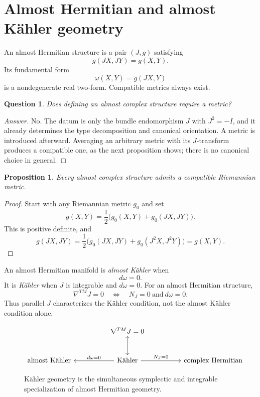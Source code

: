 \documentclass[11pt,oneside,reqno]{book}
\theoremstyle{plain}
\newtheorem{proposition}[theorem]{Proposition}
\newtheorem{question}[theorem]{Question}
\theoremstyle{definition}
\theoremstyle{remark}
\newenvironment{answer}{\begin{proof}[Answer]}{\end{proof}}
\begin{document}
\section{Almost Hermitian and almost Kähler geometry}

An almost Hermitian structure is a pair \((J,g)\) satisfying
\[
 g(JX,JY)=g(X,Y).
\]
Its fundamental form
\[
 \omega(X,Y)=g(JX,Y)
\]
is a nondegenerate real two-form. Compatible metrics always exist.

\begin{question}
Does defining an almost complex structure require a metric?
\end{question}

\begin{answer}
No.  The datum is only the bundle endomorphism \(J\) with \(J^2=-I\), and
it already determines the type decomposition and canonical orientation.
A metric is introduced afterward.  Averaging an arbitrary metric with its
\(J\)-transform produces a compatible one, as the next proposition shows;
there is no canonical choice in general.
\end{answer}

\begin{proposition}
Every almost complex structure admits a compatible Riemannian metric.
\end{proposition}

\begin{proof}
Start with any Riemannian metric \(g_0\) and set
\[
 g(X,Y)=\frac12\bigl(g_0(X,Y)+g_0(JX,JY)\bigr).
\]
This is positive definite, and
\[
 g(JX,JY)
 =\frac12\bigl(g_0(JX,JY)+g_0(J^2X,J^2Y)\bigr)
 =g(X,Y).
\]
\end{proof}

An almost Hermitian manifold is \emph{almost Kähler} when
\[
 d\omega=0.
\]
It is \emph{Kähler} when \(J\) is integrable and \(d\omega=0\).
For an almost Hermitian structure,
\[
 \nabla^{TM}J=0
 \quad\Longleftrightarrow\quad
 N_J=0\ \text{and}\ d\omega=0.
\]
Thus parallel \(J\) characterizes the Kähler condition, not the almost
Kähler condition alone.

\begin{figure}[htbp]
\centering
\[
\begin{tikzcd}[column sep=huge,row sep=large]
 &\nabla^{TM}J=0
   \arrow[d,leftrightarrow]&\\
 \text{almost Kähler}
 &\text{Kähler}
   \arrow[l,swap,"d\omega=0"]
   \arrow[r,"N_J=0"]
 &\text{complex Hermitian}
\end{tikzcd}
\]
\caption[Kähler geometry inside almost-Hermitian geometry]{Kähler geometry is the simultaneous symplectic and integrable
specialization of almost Hermitian geometry.}
\end{figure}
\end{document}
